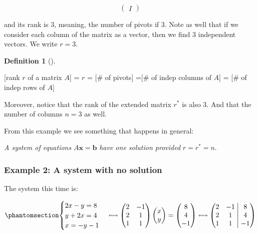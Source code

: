 \documentclass[
  letterpaper,
  DIV=11,
  numbers=noendperiod]{scrartcl}
\theoremstyle{definition}
\newtheorem{definition}{Definition}[section]
\theoremstyle{remark}
\begin{document}
\[
\begin{pmatrix}I\end{pmatrix}
\]

and its rank is \(3\), meaning, the number of pivots if \(3\). Note as
well that if we consider each column of the matrix as a vector, then we
find \(3\) independent vectors. We write \(r=3\).

\begin{definition}[]\protect\hypertarget{def-rank}{}\label{def-rank}

{[}rank \(r\) of a matrix \(A\){]} = \(r\) = {[}\# of pivots{]} ={[}\#
of indep columns of \(A\){]} = {[}\# of indep rows of \(A\){]}

\end{definition}

Moreover, notice that the rank of the extended matrix \(r^*\) is also
\(3\). And that the number of columns \(n=3\) as well.

From this example we see something that happens in general:

\emph{A system of equations} \(A\mathbf{x}=\mathbf{b}\) \emph{have one
solution provided} \(r=r^*=n\).

\subsubsection{Example 2: A system with no
solution}\label{example-2-a-system-with-no-solution}

The system this time is:

\begin{equation}\phantomsection\label{eq-impossible_1}{
\begin{cases}
2x-y=8\\
y+2x = 4\\
x=-y-1
\end{cases}
\leftrightsquigarrow
\begin{pmatrix}
2 & -1\\
2 & 1\\
1 & 1
\end{pmatrix}
\begin{pmatrix}
x\\
y
\end{pmatrix}
=
\begin{pmatrix}
8\\
4\\
-1
\end{pmatrix}
\leftrightsquigarrow
\left(
\begin{matrix}
2 & -1 \\
2 & 1  \\
1 & 1 
\end{matrix}
\;\middle|\;
\begin{matrix}
8\\
4\\
-1
\end{matrix}
\right)
}\end{equation}
\end{document}
